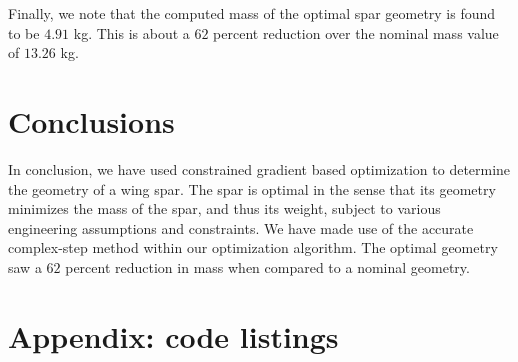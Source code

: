 \documentclass[11pt]{article}
\begin{document}
Finally, we note that the computed mass of the
optimal spar geometry is found to be
$4.91$ kg. This is about a  $62$ percent
reduction over the nominal mass value of $13.26$ kg.

\section{Conclusions}

In conclusion, we have used constrained gradient based
optimization to determine the geometry of a
wing spar. The spar is optimal in the sense that its
geometry minimizes the mass of the spar, and thus
its weight, subject to various engineering assumptions
and constraints. We have made use of the accurate
complex-step method within our optimization algorithm.
The optimal geometry saw a $62$ percent reduction
in mass when compared to a nominal geometry.

\newpage

\section{Appendix: code listings}



\newpage


\newpage


\newpage

\newpage

\end{document}
